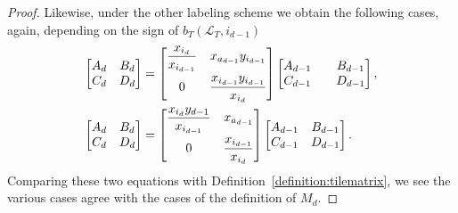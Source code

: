 \documentclass[10pt,a4paper]{amsart}
\numberwithin{equation}{section}
\theoremstyle{definition}
\begin{document}
\begin{proof}
Likewise, under the other labeling scheme we obtain the following cases, again, depending on the sign of $b_T(\mathcal{L}_T, i_{d-1})$
\begin{align*}
 \begin{bmatrix}
 A_d & B_d\\
 C_d & D_d
 \end{bmatrix}&=
\begin{bmatrix}
 \dfrac{x_{i_d}}{x_{i_{d-1}}} & x_{a_{d-1}}y_{i_{d-1}}\vspace{1mm}\\
 0 & \dfrac{x_{i_{d-1}}y_{i_{d-1}}}{x_{i_d}}
\end{bmatrix}
\begin{bmatrix}
 A_{d-1} && B_{d-1}\\
 C_{d-1} && D_{d-1}
 \end{bmatrix},
 \\
 \begin{bmatrix}
 A_d & B_d\\
 C_d & D_d
 \end{bmatrix}&=
\begin{bmatrix}
 \dfrac{x_{i_d}y_{d-1}}{x_{i_{d-1}}} & x_{a_{d-1}}\vspace{1mm}\\
 0 & \dfrac{x_{i_{d-1}}}{x_{i_d}}
\end{bmatrix}
\begin{bmatrix}
 A_{d-1} & B_{d-1}\\
 C_{d-1} & D_{d-1}
 \end{bmatrix}.
\end{align*}
Comparing these two equations with Definition~\ref{definition:tilematrix}, we see the various cases agree with the cases of the definition of $M_d$.
\end{proof}
\end{document}
